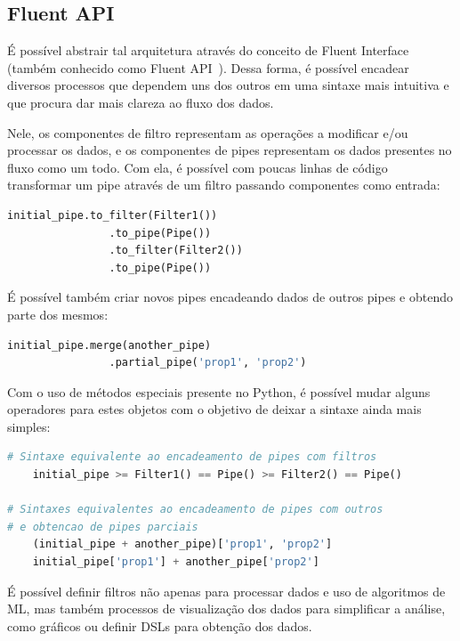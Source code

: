 \documentclass[portugues, 12pt, a4paper]{article}
\begin{document}
\subsection{Fluent API}

É possível abstrair tal arquitetura através do conceito de Fluent Interface~\citep{Fowler_2005} (também conhecido como Fluent API~\citep{Nakamaru_2020}). Dessa forma, é possível encadear diversos processos que dependem uns dos outros em uma sintaxe mais intuitiva e que procura dar mais clareza ao fluxo dos dados.

Nele, os componentes de filtro representam as operações a modificar e/ou processar os dados, e os componentes de pipes representam os dados presentes no fluxo como um todo. Com ela, é possível com poucas linhas de código transformar um pipe através de um filtro passando componentes como entrada:

\begin{lstlisting}[language=Python, caption=Manipulações de pipes em filtros]
	initial_pipe.to_filter(Filter1())
				.to_pipe(Pipe())
				.to_filter(Filter2())
				.to_pipe(Pipe())
\end{lstlisting}

É possível também criar novos pipes encadeando dados de outros pipes e obtendo parte dos mesmos:

\begin{lstlisting}[language=Python, caption=Conversões de pipes em outros pipes]
	initial_pipe.merge(another_pipe)
				.partial_pipe('prop1', 'prop2')
\end{lstlisting}

Com o uso de métodos especiais presente no Python, é possível mudar alguns operadores para estes objetos com o objetivo de deixar a sintaxe ainda mais simples:

\begin{lstlisting}[language=Python, caption=Facilitando a sintaxe através de métodos especiais]
# Sintaxe equivalente ao encadeamento de pipes com filtros
	initial_pipe >= Filter1() == Pipe() >= Filter2() == Pipe()
	
# Sintaxes equivalentes ao encadeamento de pipes com outros
# e obtencao de pipes parciais
	(initial_pipe + another_pipe)['prop1', 'prop2']
	initial_pipe['prop1'] + another_pipe['prop2']
\end{lstlisting}

É possível definir filtros não apenas para processar dados e uso de algoritmos de ML, mas também processos de visualização dos dados para simplificar a análise, como gráficos ou definir DSLs para obtenção dos dados.
\end{document}
